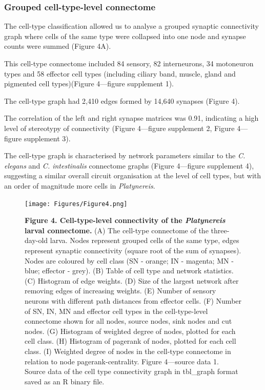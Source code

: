 \documentclass[
  11pt,
]{article}
\begin{document}
\subsubsection{Grouped cell-type-level
connectome}\label{grouped-cell-type-level-connectome}

The cell-type classification allowed us to analyse a grouped synaptic
connectivity graph where cells of the same type were collapsed into one
node and synapse counts were summed (Figure 4A).

This cell-type connectome included 84 sensory, 82 interneurons, 34
motoneuron types and 58 effector cell types (including ciliary band,
muscle, gland and pigmented cell types)(Figure 4---figure supplement 1).

The cell-type graph had 2,410 edges formed by 14,640 synapses (Figure
4).

The correlation of the left and right synapse matrices was 0.91,
indicating a high level of stereotypy of connectivity (Figure 4---figure
supplement 2, Figure 4---figure supplement 3).

The cell-type graph is characterised by network parameters similar to
the \emph{C. elegans} and \emph{C. intestinalis} connectome graphs
(Figure 4---figure supplement 4), suggesting a similar overall circuit
organisation at the level of cell types, but with an order of magnitude
more cells in \emph{Platynereis}.

\begin{figure}[H]

{\centering \texttt{[image: Figures/Figure4.png]}

}

\caption{\textbf{Figure 4. Cell-type-level connectivity of the
\emph{Platynereis} larval connectome.} (A) The cell-type connectome of
the three-day-old larva. Nodes represent grouped cells of the same type,
edges represent synaptic connectivity (square root of the sum of
synapses). Nodes are coloured by cell class (SN - orange; IN - magenta;
MN - blue; effector - grey). (B) Table of cell type and network
statistics. (C) Histogram of edge weights. (D) Size of the largest
network after removing edges of increasing weights. (E) Number of
sensory neurons with different path distances from effector cells. (F)
Number of SN, IN, MN and effector cell types in the cell-type-level
connectome shown for all nodes, source nodes, sink nodes and cut nodes.
(G) Histogram of weighted degree of nodes, plotted for each cell class.
(H) Histogram of pagerank of nodes, plotted for each cell class. (I)
Weighted degree of nodes in the cell-type connectome in relation to node
pagerank-centrality. Figure 4---source data 1. Source data of the cell
type connectivity graph in tbl\_graph format saved as an R binary file.}

\end{figure}%
\end{document}
